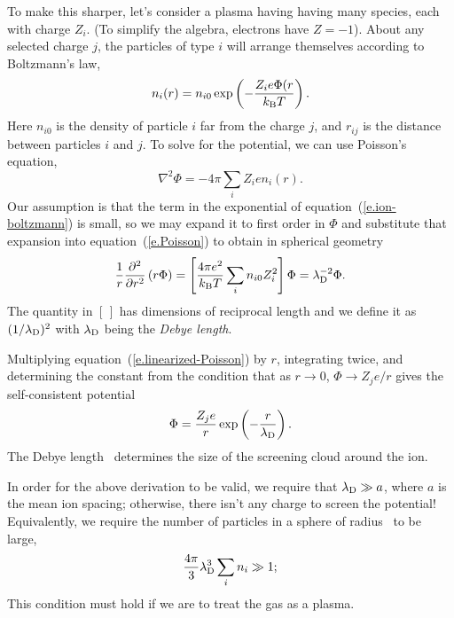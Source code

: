 To make this sharper, let's consider a plasma having having many species, each with charge $Z_{i}$.  (To simplify the algebra, electrons have $Z = -1$). About any selected charge $j$, the particles of type $i$ will arrange themselves according to Boltzmann's law,
\begin{equation}\label{e.ion-boltzmann}
n_{i}(r) = n_{i0}\exp\left(-\frac{Z_{i}e\Phi(r}{k_\mathrm{B} T}\right).
\end{equation}
Here $n_{i0}$ is the density of particle $i$ far from the charge $j$, and $r_{ij}$ is the distance between particles $i$ and $j$.  To solve for the potential, we can use Poisson's equation,
\begin{equation}\label{e.Poisson}
\nabla^{2}\Phi = -4\pi \sum_{i} Z_{i}e n_{i}(r).
\end{equation}
Our assumption is that the term in the exponential of equation~(\ref{e.ion-boltzmann}) is small, so we may expand it to first order in $\Phi$ and substitute that expansion into equation~(\ref{e.Poisson}) to obtain in spherical geometry
\begin{equation}\label{e.linearized-Poisson}
\frac{1}{r}\frac{\partial^{2}}{\partial r^{2}}\left(r\Phi\right) = \left[\frac{4\pi e^{2}}{k_\mathrm{B} T}\sum_{i} n_{i0}Z_{i}^{2}\right]\Phi = \lambda_{\mathrm{D}}^{-2}\Phi.
\end{equation}
The quantity in $[\, ]$ has dimensions of reciprocal length and we define it as $(1/\lambda_{\mathrm{D}})^{2}$ with $\lambda_{\mathrm{D}}$ being the \emph{Debye length}.

Multiplying equation~(\ref{e.linearized-Poisson}) by $r$, integrating twice, and determining the constant from the condition that as $r\to 0$, $\Phi \to Z_{j}e/r$ gives the self-consistent potential
\begin{equation}\label{e.screened-potential}
\Phi = \frac{Z_{j}e}{r}\exp\left(-\frac{r}{\lambda_{\mathrm{D}}}\right).
\end{equation}
The Debye length \lambdaD\ determines the size of the screening cloud around the ion.

In order for the above derivation to be valid, we require that $\lambda_{\mathrm{D}} \gg a$, where $a$ is the mean ion spacing; otherwise, there isn't any charge to screen the potential! Equivalently, we require the number of particles in a sphere of radius \lambdaD\ to be large,
\begin{equation}\label{e.plasma-parameter}
\frac{4\pi}{3}\lambda_{\mathrm{D}}^{3} \sum_{i} n_{i} \gg 1;
\end{equation}
This condition must hold if we are to treat the gas as a plasma.

